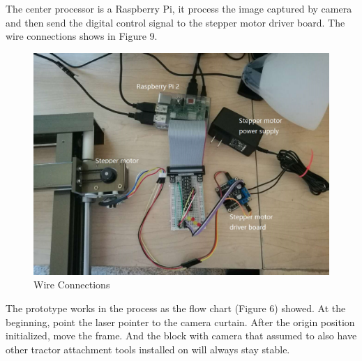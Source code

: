 \documentclass[12pt]{article}
\begin{document}
\begin{flushleft}
The center processor is a Raspberry Pi, it process the image captured by camera and then send the digital control signal to the stepper motor driver board. The wire connections shows in Figure 9.
\begin{figure}[ht!]
	\begin{center}
		\includegraphics[scale = 0.4]{connection.jpg}
		\caption{Wire Connections}
	\end{center}
\end{figure}
The prototype works in the process as the flow chart (Figure 6) showed. At the beginning, point the laser pointer to the camera curtain. After the origin position initialized, move the frame. And the block with camera that assumed to also have other tractor attachment tools installed on will always stay stable. 



\end{flushleft}
\end{document}
